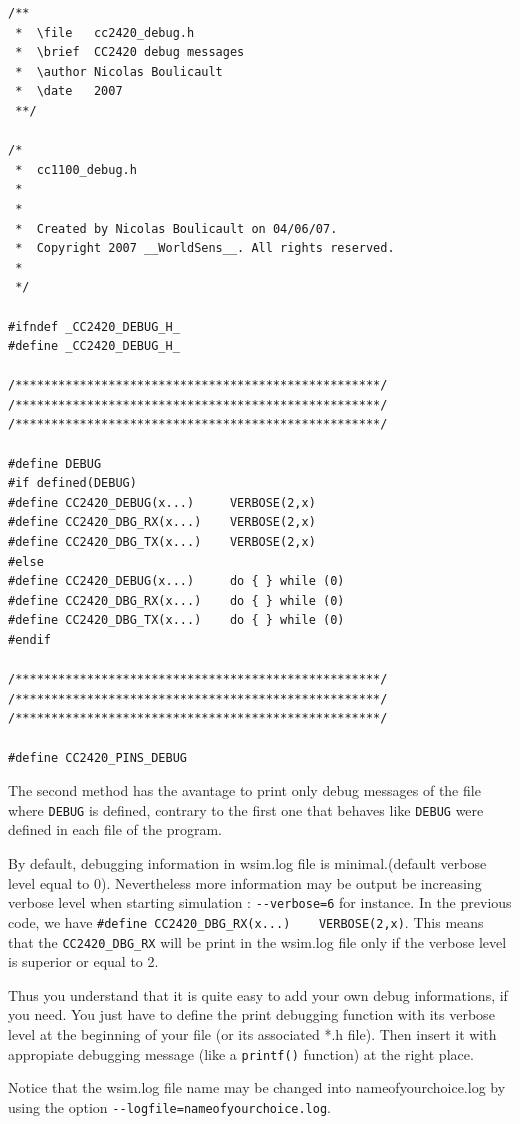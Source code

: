 \documentclass[a4paper,10pt]{report}
\begin{document}
\begin{verbatim}
/**
 *  \file   cc2420_debug.h
 *  \brief  CC2420 debug messages 
 *  \author Nicolas Boulicault
 *  \date   2007
 **/

/*
 *  cc1100_debug.h
 *  
 *
 *  Created by Nicolas Boulicault on 04/06/07.
 *  Copyright 2007 __WorldSens__. All rights reserved.
 *
 */

#ifndef _CC2420_DEBUG_H_
#define _CC2420_DEBUG_H_

/***************************************************/
/***************************************************/
/***************************************************/

#define DEBUG
#if defined(DEBUG)
#define CC2420_DEBUG(x...)     VERBOSE(2,x)
#define CC2420_DBG_RX(x...)    VERBOSE(2,x)
#define CC2420_DBG_TX(x...)    VERBOSE(2,x)
#else
#define CC2420_DEBUG(x...)     do { } while (0)
#define CC2420_DBG_RX(x...)    do { } while (0)
#define CC2420_DBG_TX(x...)    do { } while (0)
#endif

/***************************************************/
/***************************************************/
/***************************************************/

#define CC2420_PINS_DEBUG

\end{verbatim}

The second method has the avantage to print only debug messages of the file where \verb$DEBUG$ is defined, contrary to the first one that behaves like \verb$DEBUG$ were defined in each file of the program.

By default, debugging information in wsim.log file is minimal.(default verbose level equal to 0). Nevertheless more information may be output be increasing verbose level when starting simulation : \verb$--verbose=6$ for instance.
In the previous code, we have \verb$#define CC2420_DBG_RX(x...)    VERBOSE(2,x)$. This means that the \verb$CC2420_DBG_RX$ will be print in the wsim.log file only if the verbose level is superior or equal to 2.

Thus you understand that it is quite easy to add your own debug informations, if you need. You just have to define the print debugging function with its verbose level at the beginning of your file (or its associated *.h file). Then insert it with appropiate debugging message (like a \verb$printf()$ function) at the right place.

Notice that the wsim.log file name may be changed into nameofyourchoice.log by using the option \verb$--logfile=nameofyourchoice.log$.
\end{document}
